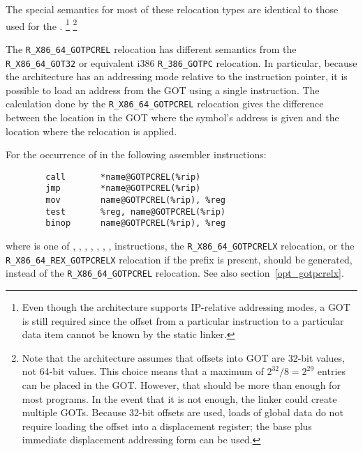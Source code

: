 The special semantics for most of these relocation types are identical
to those used for the \intelabi.  \footnote{Even though
  the \xARCH architecture supports IP-relative addressing modes, a GOT
  is still required since the offset from a particular instruction to
  a particular data item cannot be known by the static linker.}
\footnote{Note that the \xARCH architecture assumes that offsets into
  GOT are 32-bit values, not 64-bit values.  This choice means that a
  maximum of $2^{32}/8 = 2^{29}$ entries can be placed in the GOT.
  However, that should be more than enough for most programs.  In the
  event that it is not enough, the linker could create multiple GOTs.
  Because 32-bit offsets are used, loads of global data do not require
  loading the offset into a displacement register; the base plus
  immediate displacement addressing form can be used.}

\begin{sloppypar}
The \texttt{R_X86_64_GOTPCREL} relocation has different semantics from the
\texttt{R_X86_64_GOT32} or equivalent i386 \texttt{R_386_GOTPC} relocation.
In particular, because the \xARCH architecture has an addressing mode relative
to the instruction pointer, it is possible to load an address from the GOT
using a single instruction.  The calculation done by the
\texttt{R_X86_64_GOTPCREL} relocation gives the difference between the location
in the GOT where the symbol's address is given and the location where the
relocation is applied.
\end{sloppypar}

For the occurrence of  in the following assembler
instructions:

\begin{footnotesize}
\begin{verbatim}
        call       *name@GOTPCREL(%rip)
        jmp        *name@GOTPCREL(%rip)
        mov        name@GOTPCREL(%rip), %reg
        test       %reg, name@GOTPCREL(%rip)
        binop      name@GOTPCREL(%rip), %reg
\end{verbatim}
\end{footnotesize}

\noindent
\begin{sloppypar}
where  is one of , , ,
, , , , 
instructions, the \texttt{R_X86_64_GOTPCRELX} relocation,
or the \texttt{R_X86_64_REX_GOTPCRELX} relocation if the
 prefix is present, should be generated,
instead of the \texttt{R_X86_64_GOTPCREL} relocation.  See also
section~\ref{opt_gotpcrelx}.
\end{sloppypar}

